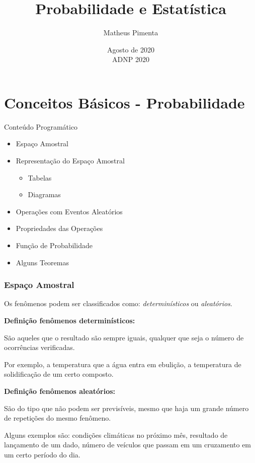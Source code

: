 \documentclass[hyperref={pdfpagelabels=false}]{beamer}
\title{Probabilidade e Estatística}
\author[Matheus Pimenta]{Matheus Pimenta}
\institute[UTFPR-CP]{\normalsize Universidade Tecnológica Federal do Paraná \\
	Câmpus Cornélio Procópio
}
\date{Agosto de 2020 \\ ADNP 2020}
\begin{document}
	
\begin{frame}
\titlepage
\end{frame} 




\section{Conceitos Básicos - Probabilidade} 

\begin{frame}{Conteúdo Programático}
	\begin{itemize}
		\item Espaço Amostral
		\pause
		\item Representação do Espaço Amostral
		\pause
		\begin{itemize}
			\item Tabelas
			\pause
			\item Diagramas
		\end{itemize}
		\pause
		\item Operações com Eventos Aleatórios
		\pause
		\item Propriedades das Operações
		\pause
		\item Função de Probabilidade
		\pause
		\item Alguns Teoremas
	\end{itemize}
\end{frame}

\begin{frame}
\frametitle{Espaço Amostral}

Os fenômenos podem ser classificados como: {\it determinísticos} ou {\it aleatórios}.

\pause

{\bf Definição fenômenos determinísticos:}

São aqueles que o resultado são sempre iguais, qualquer que seja o número de ocorrências verificadas.

Por exemplo, a temperatura que a água entra em ebulição, a temperatura de solidificação de um certo composto.

\pause

{\bf Definição fenômenos aleatórios:}

São do tipo que não podem ser previsíveis, mesmo que haja um grande número de repetições do mesmo fenômeno. 

Alguns exemplos são: condições climáticas no próximo mês, resultado de lançamento de um dado, número de veículos que passam em um cruzamento em um certo período do dia.

\end{frame}
\end{document}
